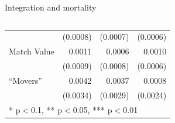 \documentclass[t]{beamer}
\begin{document}
\begin{frame}{Integration and mortality}
{\begin{columns}
\begin{column}{.6\textwidth}
\begin{table}[htb!]
{\begin{tabular}{l|rrr}
                            &   (0.0008)    &    (0.0007)  &     (0.0006)   \\
                Match Value &     0.0011    &     0.0006   &      0.0010   \\
                            &   (0.0009)    &    (0.0008)  &     (0.0006) \\
                ``Movers''  &     0.0042    &     0.0037   &      0.0008   \\
                            &   (0.0034)    &    (0.0029)  &     (0.0024)  \\
                \hline
                \multicolumn{4}{l}{* p$<$0.1, ** p$<$0.05, *** p$<$0.01}
            \end{tabular}}
            \end{table}
        \end{column}
    \end{columns}
    }
\end{frame}
\end{document}
